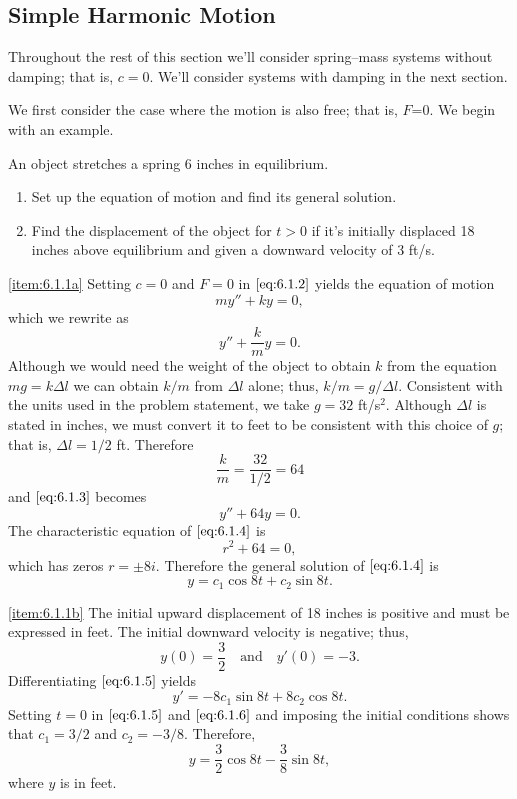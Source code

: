 \documentclass{ximera}
\begin{document}
 
\subsection*{Simple Harmonic Motion}
 
Throughout the rest of this section we'll consider spring--mass
systems without damping; that is, $c=0$. We'll consider systems with
damping in the next section.
 
We first consider the case where the motion is also free; that is,
$F$=0. We begin with an example.
 
\begin{example}\label{example:6.1.1}
An object stretches a spring 6 inches in equilibrium.
\begin{enumerate}
\item \label{item:6.1.1a} %
Set up the equation of motion and find its general solution.
 
\item \label{item:6.1.1b} %
Find the displacement of the object for $t>0$ if it's initially
displaced 18 inches above equilibrium and given a downward velocity of
3 ft/s.
\end{enumerate}
 
 
\begin{explanation}
\ref{item:6.1.1a}
Setting $c=0$ and $F=0$ in $\eqref{eq:6.1.2}$ yields the equation of motion
$$
my''+ky=0,
$$
which we rewrite as
\begin{equation}\label{eq:6.1.3}
y''+\frac{k}{m}y=0.
\end{equation}
Although we would need the weight of the object to obtain $k$ from the
equation $mg=k\Delta l$ we can obtain $k/m$ from $\Delta l$ alone;
thus, $k/m=g/\Delta l$. Consistent with the units used in the problem
statement, we take $g=32$ ft/s$^2$. Although $\Delta l$ is stated in
inches, we must convert it to feet to be consistent with this choice
of $g$; that is, $\Delta l =1/2$ ft. Therefore
$$
\frac{k}{m}=\frac{32}{1/2}=64
$$
and $\eqref{eq:6.1.3}$ becomes
\begin{equation}\label{eq:6.1.4}
y''+64y=0.
\end{equation}
The characteristic equation of $\eqref{eq:6.1.4}$ is
$$
r^2+64=0,
$$
which has zeros $r=\pm 8i$. Therefore the general solution of
$\eqref{eq:6.1.4}$ is
\begin{equation}\label{eq:6.1.5}
y=c_1\cos8t+c_2\sin8t.
\end{equation}
 
\ref{item:6.1.1b}
The initial upward displacement of 18 inches is positive and must be
expressed in feet. The initial downward velocity is negative;   thus,
$$
y(0)=\frac{3}{2}\quad\mbox{and}\quad y'(0)=-3.
$$
Differentiating $\eqref{eq:6.1.5}$ yields
\begin{equation}\label{eq:6.1.6}
y'=-8c_1\sin8t+8c_2\cos8t.
\end{equation}
Setting $t=0$ in $\eqref{eq:6.1.5}$ and $\eqref{eq:6.1.6}$ and imposing the initial conditions shows that $c_1=3/2$ and $c_2=-3/8$. Therefore,
$$
y=\frac{3}{2}\cos8t-\frac{3}{8}\sin8t,
$$
where $y$ is in feet.


\end{explanation}
\end{example}
\end{document}
